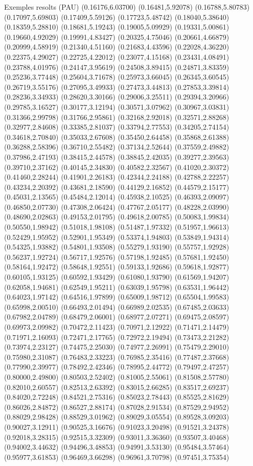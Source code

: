 \documentclass[11pt,a4paper]{article}
\begin{document}
\begin{fmex}{Exemples resolts (PAU)}
(0.16176,6.03700) (0.16481,5.92078) (0.16788,5.80783) (0.17097,5.69803) (0.17409,5.59126) (0.17723,5.48742) (0.18040,5.38640) (0.18359,5.28810) (0.18681,5.19243) (0.19005,5.09929) (0.19331,5.00861) (0.19660,4.92029) (0.19991,4.83427) (0.20325,4.75046) (0.20661,4.66879) (0.20999,4.58919) (0.21340,4.51160) (0.21683,4.43596) (0.22028,4.36220) (0.22375,4.29027) (0.22725,4.22012) (0.23077,4.15168) (0.23431,4.08491) (0.23788,4.01976) (0.24147,3.95619) (0.24508,3.89415) (0.24871,3.83359) (0.25236,3.77448) (0.25604,3.71678) (0.25973,3.66045) (0.26345,3.60545) (0.26719,3.55176) (0.27095,3.49933) (0.27473,3.44813) (0.27853,3.39814) (0.28236,3.34933) (0.28620,3.30166) (0.29006,3.25511) (0.29394,3.20966) (0.29785,3.16527) (0.30177,3.12194) (0.30571,3.07962) (0.30967,3.03831) (0.31366,2.99798) (0.31766,2.95861) (0.32168,2.92018) (0.32571,2.88268) (0.32977,2.84608) (0.33385,2.81037) (0.33794,2.77553) (0.34205,2.74154) (0.34618,2.70840) (0.35033,2.67608) (0.35450,2.64458) (0.35868,2.61388) (0.36288,2.58396) (0.36710,2.55482) (0.37134,2.52644) (0.37559,2.49882) (0.37986,2.47193) (0.38415,2.44578) (0.38845,2.42035) (0.39277,2.39563) (0.39710,2.37162) (0.40145,2.34830) (0.40582,2.32567) (0.41020,2.30372) (0.41460,2.28244) (0.41901,2.26183) (0.42344,2.24188) (0.42788,2.22257) (0.43234,2.20392) (0.43681,2.18590) (0.44129,2.16852) (0.44579,2.15177) (0.45031,2.13565) (0.45484,2.12014) (0.45938,2.10525) (0.46393,2.09097) (0.46850,2.07730) (0.47308,2.06424) (0.47767,2.05177) (0.48228,2.03990) (0.48690,2.02863) (0.49153,2.01795) (0.49618,2.00785) (0.50083,1.99834) (0.50550,1.98942) (0.51018,1.98108) (0.51487,1.97332) (0.51957,1.96613) (0.52429,1.95952) (0.52901,1.95349) (0.53374,1.94803) (0.53849,1.94314) (0.54325,1.93882) (0.54801,1.93508) (0.55279,1.93190) (0.55757,1.92928) (0.56237,1.92724) (0.56717,1.92576) (0.57198,1.92485) (0.57681,1.92450) (0.58164,1.92472) (0.58648,1.92551) (0.59133,1.92686) (0.59618,1.92877) (0.60105,1.93125) (0.60592,1.93429) (0.61080,1.93790) (0.61569,1.94207) (0.62058,1.94681) (0.62549,1.95211) (0.63039,1.95798) (0.63531,1.96442) (0.64023,1.97142) (0.64516,1.97899) (0.65009,1.98712) (0.65504,1.99583) (0.65998,2.00510) (0.66493,2.01494) (0.66989,2.02535) (0.67485,2.03633) (0.67982,2.04789) (0.68479,2.06001) (0.68977,2.07271) (0.69475,2.08597) (0.69973,2.09982) (0.70472,2.11423) (0.70971,2.12922) (0.71471,2.14479) (0.71971,2.16093) (0.72471,2.17765) (0.72972,2.19494) (0.73473,2.21282) (0.73974,2.23127) (0.74475,2.25030) (0.74977,2.26991) (0.75479,2.29010) (0.75980,2.31087) (0.76483,2.33223) (0.76985,2.35416) (0.77487,2.37668) (0.77990,2.39977) (0.78492,2.42346) (0.78995,2.44772) (0.79497,2.47257) (0.80000,2.49800) (0.80503,2.52402) (0.81005,2.55061) (0.81508,2.57780) (0.82010,2.60557) (0.82513,2.63392) (0.83015,2.66285) (0.83517,2.69237) (0.84020,2.72248) (0.84521,2.75316) (0.85023,2.78443) (0.85525,2.81629) (0.86026,2.84872) (0.86527,2.88174) (0.87028,2.91534) (0.87529,2.94952) (0.88029,2.98428) (0.88529,3.01962) (0.89029,3.05554) (0.89528,3.09203) (0.90027,3.12911) (0.90525,3.16676) (0.91023,3.20498) (0.91521,3.24378) (0.92018,3.28315) (0.92515,3.32309) (0.93011,3.36360) (0.93507,3.40468) (0.94002,3.44632) (0.94496,3.48853) (0.94991,3.53130) (0.95484,3.57464) (0.95977,3.61853) (0.96469,3.66298) (0.96961,3.70798) (0.97451,3.75354) 
\end{fmex}
\end{document}

